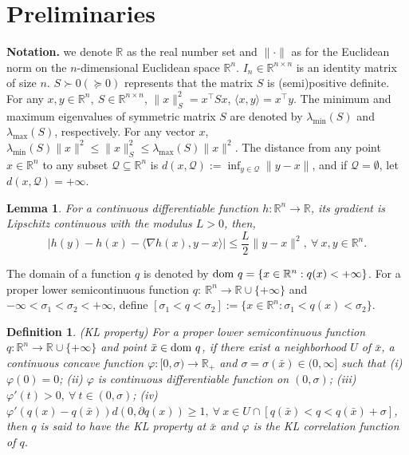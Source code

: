 \documentclass[pdflatex,sn-mathphys-num]{sn-jnl}%
\theoremstyle{thmstyleone}%
\newtheorem{lemma}{Lemma}
\theoremstyle{thmstyletwo}%
\theoremstyle{thmstylethree}%
\newtheorem{definition}{Definition}%
\begin{document}
\section{Preliminaries}\label{sec2}
\textbf{Notation.} we denote $\mathbb{R}$ as the real number set and $\|\cdot\|$ as for the Euclidean norm on the $n$-dimensional Euclidean space $\mathbb{R}^{n}$. $I_n\in\mathbb{R}^{n\times n}$ is an identity matrix of size $n$. $S\succ0(\succeq0)$ represents that the matrix $S$ is (semi)positive definite.
For any $x,y\in\mathbb{R}^{n},~S\in\mathbb{R}^{n\times n}$, $\|x\|_{S}^2={x^{\top}Sx}$, $\langle x,y\rangle=x^\top y$.
The minimum and maximum eigenvalues of symmetric matrix $S$ are denoted by $\lambda_{\min}(S)$ and $\lambda_{\max}(S)$, respectively. For any vector $x$, $\lambda_{\min}(S)\|x\|^{2}\leq\|x\|^{2}_{S}\leq\lambda_{\max}(S)\|x\|^{2}$.
The distance from any point $x\in \mathbb{R}^n$ to any subset $\mathcal{Q}\subseteq \mathbb{R}^n$ is $d(x,\mathcal{Q}):= \inf_{y\in \mathcal{Q}}\|y-x\|$, and if $\mathcal{Q}=\emptyset$, let $d(x,\mathcal{Q})=+\infty$.

\begin{lemma} {\rm \cite{Nesterov2018}}
For a continuous differentiable function $h: \mathbb{R}^n\to\mathbb{R}$, its gradient is Lipschitz continuous with the modulus $L>0$, then,
$$|h(y)-h(x)-\langle\nabla h(x),y-x\rangle|\leq\frac{L}{2}\|y-x\|^{2},~\forall~x,y\in\mathbb{R}^n.$$
\end{lemma}

The domain of a function $q$ is denoted by ${\rm dom}~q=\{x\in\mathbb{R}^n:q(x)<+\infty\}$. For a proper lower semicontinuous function $q:\ \mathbb {R}^n\to \mathbb {R}\cup \{+\infty\}$ and $-\infty<\sigma _{1}<\sigma _{2}<+\infty$, define
$[\sigma _{1}<q<\sigma _{2}]:=\{x\in\mathbb{R}^n:\sigma _{1}<q(x)<\sigma _{2}\}.$

\begin{definition}{\rm \cite{ABS13} (KL property)
For a proper lower semicontinuous function  $q:\mathbb {R}^n\to \mathbb {R}\cup \{+\infty\}$ and point $\bar{x}\in {\rm dom}~q$, if there exist a neighborhood $U$ of $\bar{x}$, a continuous concave function $\varphi:[0,\sigma )\to\mathbb{R}_{+}$ and $\sigma=\sigma(\bar{x}) \in(0,\infty]$ such that
(i) $\varphi(0) = 0$;
(ii) $\varphi$ is continuous differentiable function on $(0,\sigma )$;
(iii) $\varphi'(t)>0,~\forall~t\in (0,\sigma )$;
(iv) $\varphi'(q(x)-q(\bar{x}))d(0,\partial q(x))\geq1,~\forall~x\in U\cap[q(\bar{x})<q<q(\bar{x})+\sigma ]$,
then $q$ is said to have the KL property at $\bar{x}$ and $\varphi$ is the KL correlation function of $q$.
}\end{definition}
\end{document}
